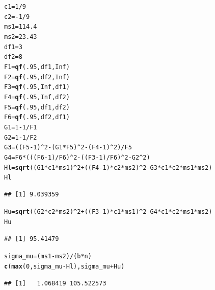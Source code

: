 \documentclass{article}\usepackage[]{graphicx}\usepackage[]{color}
\makeatletter
\newcommand{\hlnum}[1]{\textcolor[rgb]{0.686,0.059,0.569}{#1}}%
\newcommand{\hlopt}[1]{\textcolor[rgb]{0,0,0}{#1}}%
\newcommand{\hlstd}[1]{\textcolor[rgb]{0.345,0.345,0.345}{#1}}%
\newcommand{\hlkwb}[1]{\textcolor[rgb]{0.69,0.353,0.396}{#1}}%
\newcommand{\hlkwd}[1]{\textcolor[rgb]{0.737,0.353,0.396}{\textbf{#1}}}%
\newenvironment{kframe}{%
 \def\at@end@of@kframe{}%
 \ifinner\ifhmode%
  \def\at@end@of@kframe{\end{minipage}}%
  \begin{minipage}{\columnwidth}%
 \fi\fi%
 \def\FrameCommand##1{\hskip\@totalleftmargin \hskip-\fboxsep
 \colorbox{shadecolor}{##1}\hskip-\fboxsep
     \hskip-\linewidth \hskip-\@totalleftmargin \hskip\columnwidth}%
 \MakeFramed {\advance\hsize-\width
   \@totalleftmargin\z@ \linewidth\hsize
   \@setminipage}}%
 {\par\unskip\endMakeFramed%
 \at@end@of@kframe}
\newenvironment{knitrout}{}{} %
\makeatother
\begin{document}
\begin{enumerate}[(a)]
\begin{knitrout}
\color{fgcolor}\begin{kframe}
\begin{alltt}
  \hlstd{c1}\hlkwb{=}\hlnum{1}\hlopt{/}\hlnum{9}
  \hlstd{c2}\hlkwb{=}\hlopt{-}\hlnum{1}\hlopt{/}\hlnum{9}
  \hlstd{ms1}\hlkwb{=}\hlnum{114.4}
  \hlstd{ms2}\hlkwb{=}\hlnum{23.43}
  \hlstd{df1}\hlkwb{=}\hlnum{3}
  \hlstd{df2}\hlkwb{=}\hlnum{8}
  \hlstd{F1}\hlkwb{=}\hlkwd{qf}\hlstd{(}\hlnum{.95}\hlstd{,df1,}\hlnum{Inf}\hlstd{)}
  \hlstd{F2}\hlkwb{=}\hlkwd{qf}\hlstd{(}\hlnum{.95}\hlstd{,df2,}\hlnum{Inf}\hlstd{)}
  \hlstd{F3}\hlkwb{=}\hlkwd{qf}\hlstd{(}\hlnum{.95}\hlstd{,}\hlnum{Inf}\hlstd{,df1)}
  \hlstd{F4}\hlkwb{=}\hlkwd{qf}\hlstd{(}\hlnum{.95}\hlstd{,}\hlnum{Inf}\hlstd{,df2)}
  \hlstd{F5}\hlkwb{=}\hlkwd{qf}\hlstd{(}\hlnum{.95}\hlstd{,df1,df2)}
  \hlstd{F6}\hlkwb{=}\hlkwd{qf}\hlstd{(}\hlnum{.95}\hlstd{,df2,df1)}
  \hlstd{G1}\hlkwb{=}\hlnum{1}\hlopt{-}\hlnum{1}\hlopt{/}\hlstd{F1}
  \hlstd{G2}\hlkwb{=}\hlnum{1}\hlopt{-}\hlnum{1}\hlopt{/}\hlstd{F2}
  \hlstd{G3}\hlkwb{=}\hlstd{((F5}\hlopt{-}\hlnum{1}\hlstd{)}\hlopt{^}\hlnum{2}\hlopt{-}\hlstd{(G1}\hlopt{*}\hlstd{F5)}\hlopt{^}\hlnum{2}\hlopt{-}\hlstd{(F4}\hlopt{-}\hlnum{1}\hlstd{)}\hlopt{^}\hlnum{2}\hlstd{)}\hlopt{/}\hlstd{F5}
  \hlstd{G4}\hlkwb{=}\hlstd{F6}\hlopt{*}\hlstd{( ((F6}\hlopt{-}\hlnum{1}\hlstd{)}\hlopt{/}\hlstd{F6)}\hlopt{^}\hlnum{2} \hlopt{-} \hlstd{((F3}\hlopt{-}\hlnum{1}\hlstd{)}\hlopt{/}\hlstd{F6)}\hlopt{^}\hlnum{2} \hlopt{-} \hlstd{G2}\hlopt{^}\hlnum{2} \hlstd{)}
  \hlstd{Hl} \hlkwb{=} \hlkwd{sqrt}\hlstd{( (G1}\hlopt{*}\hlstd{c1}\hlopt{*}\hlstd{ms1)}\hlopt{^}\hlnum{2} \hlopt{+} \hlstd{((F4}\hlopt{-}\hlnum{1}\hlstd{)}\hlopt{*}\hlstd{c2}\hlopt{*}\hlstd{ms2)}\hlopt{^}\hlnum{2} \hlopt{-} \hlstd{G3}\hlopt{*}\hlstd{c1}\hlopt{*}\hlstd{c2}\hlopt{*}\hlstd{ms1}\hlopt{*}\hlstd{ms2)}
  \hlstd{Hl}
\end{alltt}
\begin{verbatim}
## [1] 9.039359
\end{verbatim}
\begin{alltt}
  \hlstd{Hu} \hlkwb{=} \hlkwd{sqrt}\hlstd{( (G2}\hlopt{*}\hlstd{c2}\hlopt{*}\hlstd{ms2)}\hlopt{^}\hlnum{2} \hlopt{+} \hlstd{((F3}\hlopt{-}\hlnum{1}\hlstd{)}\hlopt{*}\hlstd{c1}\hlopt{*}\hlstd{ms1)}\hlopt{^}\hlnum{2} \hlopt{-} \hlstd{G4}\hlopt{*}\hlstd{c1}\hlopt{*}\hlstd{c2}\hlopt{*}\hlstd{ms1}\hlopt{*}\hlstd{ms2)}
  \hlstd{Hu}
\end{alltt}
\begin{verbatim}
## [1] 95.41479
\end{verbatim}
\begin{alltt}
  \hlstd{sigma_mu} \hlkwb{=}  \hlstd{(ms1}\hlopt{-}\hlstd{ms2)}\hlopt{/}\hlstd{(b}\hlopt{*}\hlstd{n)}
  \hlkwd{c}\hlstd{(}\hlkwd{max}\hlstd{(}\hlnum{0}\hlstd{,sigma_mu}\hlopt{-}\hlstd{Hl), sigma_mu}\hlopt{+}\hlstd{Hu)}
\end{alltt}
\begin{verbatim}
## [1]   1.068419 105.522573
\end{verbatim}
\end{kframe}
\end{knitrout}


\end{enumerate}
\end{document}
